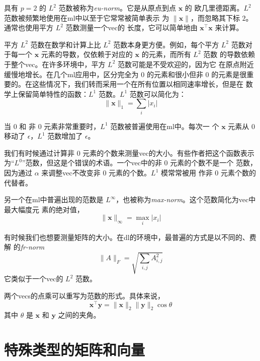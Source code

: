 具有 $p = 2$ 的 $L^2$ 范数被称为\emph{\gls{eu-norm}}。它是从原点到点 $\pmb{x}$ 的
欧几里德距离。$L^2$ 范数被频繁地使用在\gls*{ml}中以至于它常常被简单表示
为 $\|\pmb{x}\|$，而忽略其下标 $2$。通常也使用平方 $L^2$ 范数测量一个\gls*{vec}的
长度，它可以简单地由 $\pmb{x}^{\top}\pmb{x}$ 来计算。

平方 $L^2$ 范数在数学和计算上比 $L^2$ 范数本身更方便。例如，每个平方 $L^2$ 范数对
于每一个 $\pmb{x}$ 元素的导数，仅依赖于对应的 $\pmb{x}$ 的元素，而所有 $L^2$ 范数
的导数依赖于整个\gls*{vec}。在许多环境中，平方 $L^2$ 范数可能是不受欢迎的，因为它
在原点附近缓慢地增长。在几个\gls*{ml}应用中，区分完全为 $0$ 的元素和很小但非 $0$
的元素是很重要的。在这些情况下，我们转而采用一个在所有位置以相同速率增长，但是在
数学上保留简单特性的函数：$L^1$ 范数。$L^1$ 范数可以简化为：
 \begin{equation}
  \|\pmb{x}\|_1 = \sum_i|x_i|
\end{equation}

当 $0$ 和 非 $0$ 元素非常重要时，$L^1$ 范数被普遍使用在\gls*{ml}中。每次一
个 $\pmb{x}$ 元素从 $0$ 移动了 $\epsilon$，$L^1$ 范数增加了 $\epsilon$。

我们有时候通过计算非 $0$ 元素的个数来测量\gls*{vec}的大小。有些作者把这个函数表示
为``$L^0$''范数，但这是个错误的术语。一个\gls*{vec}中的非 $0$ 元素的个数不是一个
范数，因为通过 $\alpha$ 来调整\gls*{vec}不改变非 $0$ 元素的个数。$L^1$ 模常常被用
作非 $0$ 元素个数的代替者。

另一个在\gls*{ml}中普遍出现的范数是
$L^{\infty}$，也被称为\emph{\gls{max-norm}}。这个范数简化为\gls*{vec}中最大幅度元
素的绝对值，
\begin{equation}
  \|\pmb{x}\|_{\infty} = \max_i|x_i|
\end{equation}

有时候我们也想要测量矩阵的大小。在\gls*{dl}的环境中，最普遍的方式是以不同的、费解
的\emph{\gls{fr-norm}}
\begin{equation}
  \|A\|_F = \sqrt{\sum_{i,j}A_{i,j}^2}
\end{equation}
它类似于一个\gls*{vec}的 $L^2$ 范数。

两个\gls*{vecs}的点乘可以重写为范数的形式。具体来说，
\begin{equation}
  \pmb{x}^{\top}\pmb{y} = \|\pmb{x}\|_2\|\pmb{y}\|_2\cos \theta
\end{equation}
其中 $\theta$ 是 $\pmb{x}$ 和 $\pmb{y}$ 之间的夹角。

\section{特殊类型的矩阵和向量}
\label{sec:special_kinds_of_matrices_and_vectors}

